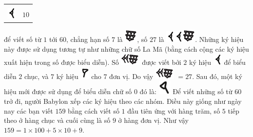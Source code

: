 \begin{multicols}{2}
\begin{table}[H]
\begin{tabular}{|c|c|}
			\hline
			& \\[-2.5ex]
			\includegraphics[scale=0.65]{16}&$10$\\
			\hline
		\end{tabular}
		\vspace*{-5pt}
	\end{table}
	để viết số từ $1$ tới $60$, chẳng hạn số $7$ là  \includegraphics[scale=0.7]{17}, số $27$ là  \includegraphics[scale=0.7]{16}\includegraphics[scale=0.7]{16}\includegraphics[scale=0.7]{17}. 	 
	\vskip 0.1cm
	Những ký hiệu này được sử dụng tương tự như những chữ số La Mã (bằng cách cộng các ký hiệu xuất hiện trong số được biểu diễn). Số \includegraphics[scale=0.7]{18} được viết bởi $2$ ký hiệu \includegraphics[scale=0.7]{16} để biểu diễn $2$ chục, và $7$ ký hiệu \includegraphics[scale=0.7]{15}  cho $7$ đơn vị. Do vậy \includegraphics[scale=0.7]{18}  $=27$.
	\vskip 0.1cm
	Sau đó, một ký hiệu mới được sử dụng để biểu diễn chữ số $0$ đó là:
	\includegraphics[scale=0.65]{15.1}
	\vskip 0.1cm
	Để viết những số từ $60$ trở đi, người Babylon xếp các ký hiệu theo các nhóm. Điều này giống như ngày nay các bạn viết $159$ bằng cách viết số $1$ đầu tiên ứng với hàng trăm, số $5$ tiếp theo ở hàng chục và cuối cùng là số $9$ ở hàng đơn vị. Như vậy $159 = 1 \times 100+ 5 \times 10+ 9$.

\end{multicols}
